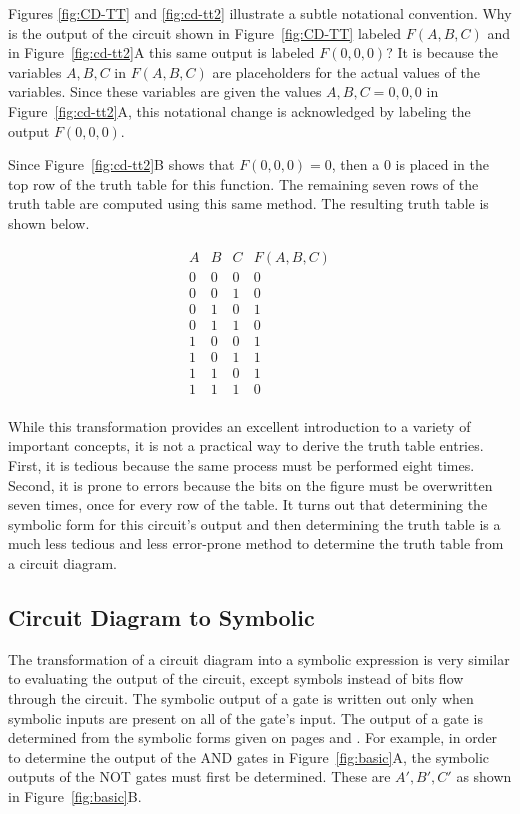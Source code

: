 Figures \ref{fig:CD-TT} and \ref{fig:cd-tt2} 
illustrate a subtle notational convention. 
Why is the output of the circuit shown in Figure~\ref{fig:CD-TT} 
labeled $F(A,B,C)$ and in Figure~\ref{fig:cd-tt2}A this same output is
labeled  $F(0,0,0)$?  It is because the variables $A,B,C$ in $F(A,B,C)$ 
are placeholders for the actual values of the variables.  Since these
variables are given the values $A,B,C = 0,0,0$ in Figure~\ref{fig:cd-tt2}A, 
this notational change is acknowledged by labeling the output $F(0,0,0)$.

Since Figure~\ref{fig:cd-tt2}B shows that $F(0,0,0) = 0$, then
a 0 is placed in the top row of the truth table for this 
function.  The remaining seven rows of the truth table are computed 
using this same method.  The resulting truth table is shown below.

$$\begin{array}{c|c|c||c}
A & B & C & F(A,B,C) \\ \hline \hline
0 & 0 & 0 & 0  \\ \hline
0 & 0 & 1 & 0  \\ \hline
0 & 1 & 0 & 1  \\ \hline
0 & 1 & 1 & 0  \\ \hline
1 & 0 & 0 & 1  \\ \hline
1 & 0 & 1 & 1  \\ \hline
1 & 1 & 0 & 1  \\ \hline
1 & 1 & 1 & 0  \\
\end{array}$$

While this transformation provides an excellent introduction to a variety
of important concepts, it is not a practical way to derive the truth table 
entries.  First, it is tedious because the same process must be performed 
eight times.  Second, it is prone to errors because the bits on the figure
must be overwritten seven times, once for every row of the table. 
It turns out that determining the symbolic
form for this circuit's output and then determining the truth table is a
much less tedious and less error-prone method to determine the truth table
from a circuit diagram.

\subsection{Circuit Diagram to Symbolic}
The transformation of a circuit diagram into a symbolic expression 
is very similar to evaluating the output of the circuit, except symbols
instead of bits flow through the circuit.  The symbolic output of 
a gate is written out only when symbolic inputs are present on all of the 
gate's input.  The output of a gate is determined from the symbolic forms
given on pages \pageref{page:elf1} and \pageref{page:elf2}.  For example, in 
order to determine the output of the AND gates in Figure~\ref{fig:basic}A, the
symbolic outputs of the NOT gates must first be determined.  These are
$A', B', C'$ as shown in Figure~\ref{fig:basic}B.

